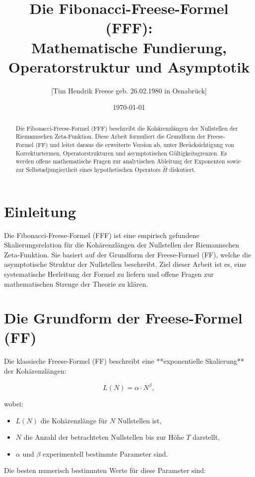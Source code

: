 \documentclass[a4paper,12pt]{article}
\title{Die Fibonacci-Freese-Formel (FFF): \\ Mathematische Fundierung, Operatorstruktur und Asymptotik}
\author{[Tim Hendrik Freese geb. 26.02.1980 in Osnabrück]}
\date{\today}
\begin{document}
\maketitle

\begin{abstract}
Die Fibonacci-Freese-Formel (FFF) beschreibt die Kohärenzlängen der Nullstellen der Riemannschen Zeta-Funktion. 
Diese Arbeit formuliert die Grundform der Freese-Formel (FF) und leitet daraus die erweiterte Version ab, unter 
Berücksichtigung von Korrekturtermen, Operatorstrukturen und asymptotischen Gültigkeitsgrenzen. Es werden 
offene mathematische Fragen zur analytischen Ableitung der Exponenten sowie zur Selbstadjungiertheit eines 
hypothetischen Operators $\hat{H}$ diskutiert.
\end{abstract}

\section{Einleitung}
Die Fibonacci-Freese-Formel (FFF) ist eine empirisch gefundene Skalierungsrelation für die 
Kohärenzlängen der Nullstellen der Riemannschen Zeta-Funktion. Sie basiert auf der Grundform der 
Freese-Formel (FF), welche die asymptotische Struktur der Nullstellen beschreibt. Ziel dieser Arbeit 
ist es, eine systematische Herleitung der Formel zu liefern und offene Fragen zur mathematischen Strenge 
der Theorie zu klären.

\section{Die Grundform der Freese-Formel (FF)}
Die klassische Freese-Formel (FF) beschreibt eine **exponentielle Skalierung** der Kohärenzlängen:

\begin{equation}
L(N) = \alpha \cdot N^\beta,
\end{equation}

wobei:
\begin{itemize}
    \item $L(N)$ die Kohärenzlänge für $N$ Nullstellen ist,
    \item $N$ die Anzahl der betrachteten Nullstellen bis zur Höhe $T$ darstellt,
    \item $\alpha$ und $\beta$ experimentell bestimmte Parameter sind.
\end{itemize}

Die besten numerisch bestimmten Werte für diese Parameter sind:
\end{document}
